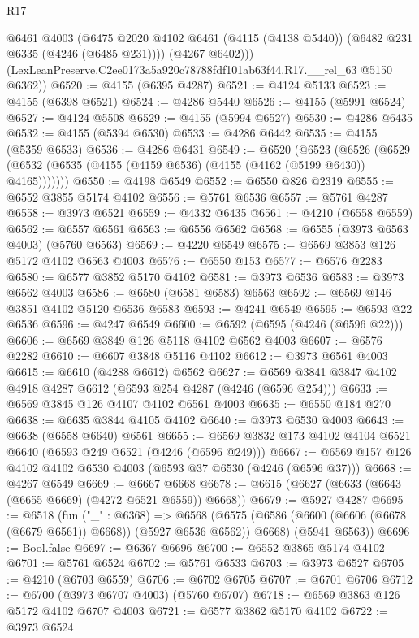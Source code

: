 \begin{lexlean}{R17}
\begin{coremodule}
          @6461
          @4003
          (@6475 @2020 @4102 @6461 (@4115 (@4138 @5440)) (@6482 @231 @6335 (@4246 (@6485 @231))))
          (@4267 @6402)))
      (LexLeanPreserve.C2ee0173a5a920c78788fdf101ab63f44.R17.__rel_63 @5150 @6362))
@6520 := @4155 (@6395 @4287)
@6521 := @4124 @5133
@6523 := @4155 (@6398 @6521)
@6524 := @4286 @5440
@6526 := @4155 (@5991 @6524)
@6527 := @4124 @5508
@6529 := @4155 (@5994 @6527)
@6530 := @4286 @6435
@6532 := @4155 (@5394 @6530)
@6533 := @4286 @6442
@6535 := @4155 (@5359 @6533)
@6536 := @4286 @6431
@6549 := @6520
    (@6523
      (@6526 (@6529 (@6532 (@6535 (@4155 (@4159 @6536) (@4155 (@4162 (@5199 @6430)) @4165)))))))
@6550 := @4198 @6549
@6552 := @6550 @826 @2319
@6555 := @6552 @3855 @5174 @4102
@6556 := @5761 @6536
@6557 := @5761 @4287
@6558 := @3973 @6521
@6559 := @4332 @6435
@6561 := @4210 (@6558 @6559)
@6562 := @6557 @6561
@6563 := @6556 @6562
@6568 := @6555 (@3973 @6563 @4003) (@5760 @6563)
@6569 := @4220 @6549
@6575 := @6569 @3853 @126 @5172 @4102 @6563 @4003
@6576 := @6550 @153
@6577 := @6576 @2283
@6580 := @6577 @3852 @5170 @4102
@6581 := @3973 @6536
@6583 := @3973 @6562 @4003
@6586 := @6580 (@6581 @6583) @6563
@6592 := @6569 @146 @3851 @4102 @5120 @6536 @6583
@6593 := @4241 @6549
@6595 := @6593 @22 @6536
@6596 := @4247 @6549
@6600 := @6592 (@6595 (@4246 (@6596 @22)))
@6606 := @6569 @3849 @126 @5118 @4102 @6562 @4003
@6607 := @6576 @2282
@6610 := @6607 @3848 @5116 @4102
@6612 := @3973 @6561 @4003
@6615 := @6610 (@4288 @6612) @6562
@6627 := @6569 @3841 @3847 @4102 @4918 @4287 @6612 (@6593 @254 @4287 (@4246 (@6596 @254)))
@6633 := @6569 @3845 @126 @4107 @4102 @6561 @4003
@6635 := @6550 @184 @270
@6638 := @6635 @3844 @4105 @4102
@6640 := @3973 @6530 @4003
@6643 := @6638 (@6558 @6640) @6561
@6655 := @6569 @3832 @173 @4102 @4104 @6521 @6640 (@6593 @249 @6521 (@4246 (@6596 @249)))
@6667 := @6569 @157 @126 @4102 @4102 @6530 @4003 (@6593 @37 @6530 (@4246 (@6596 @37)))
@6668 := @4267 @6549
@6669 := @6667 @6668
@6678 := @6615 (@6627 (@6633 (@6643 (@6655 @6669) (@4272 @6521 @6559)) @6668))
@6679 := @5927 @4287
@6695 := @6518
    (fun ("_" : @6368) =>
    @6568
      (@6575 (@6586 (@6600 (@6606 (@6678 (@6679 @6561)) @6668)) (@5927 @6536 @6562)) @6668)
      (@5941 @6563))
@6696 := Bool.false
@6697 := @6367 @6696
@6700 := @6552 @3865 @5174 @4102
@6701 := @5761 @6524
@6702 := @5761 @6533
@6703 := @3973 @6527
@6705 := @4210 (@6703 @6559)
@6706 := @6702 @6705
@6707 := @6701 @6706
@6712 := @6700 (@3973 @6707 @4003) (@5760 @6707)
@6718 := @6569 @3863 @126 @5172 @4102 @6707 @4003
@6721 := @6577 @3862 @5170 @4102
@6722 := @3973 @6524

\end{coremodule}
\end{lexlean}
